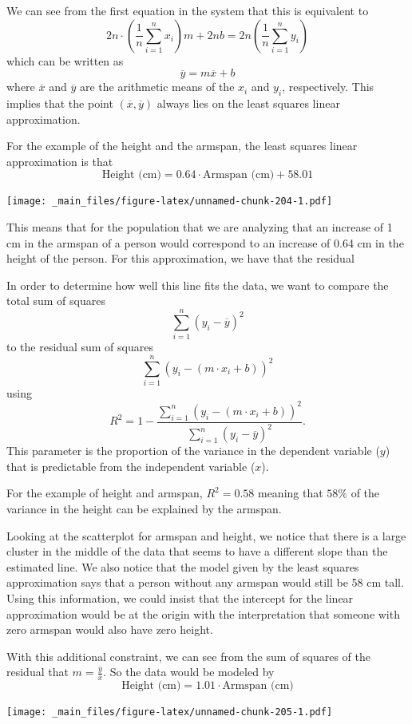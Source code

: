 \documentclass[
]{book}
\theoremstyle{definition}
\theoremstyle{definition}
\theoremstyle{definition}
\theoremstyle{definition}
\theoremstyle{remark}
\begin{document}
We can see from the first equation in the system that this is equivalent to
\[2n \cdot \left(\frac{1}{n}\sum_{i=1}^n x_i \right) m + 2n b = 2n \left(\frac{1}{n} \sum_{i=1}^n y_i \right)\] which can be written as \[\overline{y} = m \overline{x} +b\] where \(\overline{x}\) and \(\overline{y}\) are the arithmetic means of the \(x_i\) and \(y_i\), respectively. This implies that the point \((\overline{x},\overline{y})\) always lies on the least squares linear approximation.

For the example of the height and the armspan, the least squares linear approximation is that
\[\mbox{Height (cm)} = 0.64 \cdot \mbox{Armspan (cm)} + 58.01\]

\texttt{[image: \_main\_files/figure-latex/unnamed-chunk-204-1.pdf]}

This means that for the population that we are analyzing that an increase of 1 cm in the armspan of a person would correspond to an increase of 0.64 cm in the height of the person. For this approximation, we have that the residual

In order to determine how well this line fits the data, we want to compare the total sum of squares
\[\sum_{i=1}^n (y_i - \overline{y} )^2\] to the residual sum of squares \[\sum_{i=1}^n ( y_i - (m\cdot x_i +b))^2\] using
\[R^2 = 1 - \frac{\sum_{i=1}^n ( y_i - (m\cdot x_i +b))^2}{\sum_{i=1}^n (y_i - \overline{y} )^2}.\]
This parameter is the proportion of the variance in the dependent variable (\(y\)) that is predictable from the independent variable (\(x\)).

For the example of height and armspan, \(R^2= 0.58\) meaning that \(58\%\) of the variance in the height can be explained by the armspan.

Looking at the scatterplot for armspan and height, we notice that there is a large cluster in the middle of the data that seems to have a different slope than the estimated line. We also notice that the model given by the least squares approximation says that a person without any armspan would still be 58 cm tall. Using this information, we could insist that the intercept for the linear approximation would be at the origin with the interpretation that someone with zero armspan would also have zero height.

With this additional constraint, we can see from the sum of squares of the residual that \(m = \frac{\overline{y}}{\overline{x}}\). So the data would be modeled by
\[\mbox{Height (cm)} = 1.01 \cdot \mbox{Armspan (cm)} \]

\texttt{[image: \_main\_files/figure-latex/unnamed-chunk-205-1.pdf]}
\end{document}
